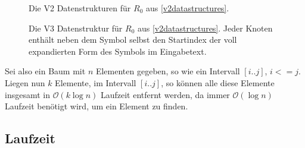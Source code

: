 \begin{figure}
    \centering
    \begin{minipage}{0.3\textwidth}
        \centering
        
        \caption{Die V2 Datenstrukturen für $R_0$ aus \autoref{v2datastructures}.}
        \label{v2ruledatastructure}
    \end{minipage}
    \quad
    \begin{minipage}{0.60\textwidth}
        \centering
        \caption{Die V3 Datenstruktur für $R_0$ aus \autoref{v2datastructures}. Jeder Knoten enthält neben dem Symbol selbst den Startindex der voll expandierten Form des Symbols im Eingabetext.}
        \label{v3ruledatastructure}
    \end{minipage}
    

\end{figure}

Sei also ein Baum mit $n$ Elementen gegeben, so wie ein Intervall $[i..j]$, $i <= j$. Liegen nun $k$ Elemente, im Intervall $[i..j]$, so können alle diese Elemente insgesamt in $\mathcal{O}(k \log n)$ Laufzeit entfernt werden, da immer $\mathcal{O}(\log n)$ Laufzeit benötigt wird, um ein Element zu finden.

\subsection{Laufzeit}

